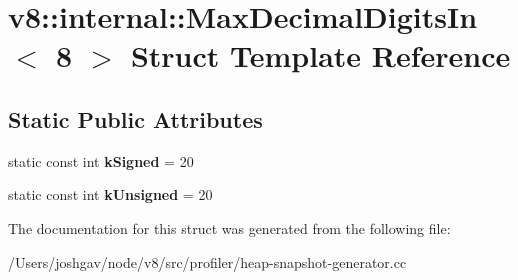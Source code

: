 \hypertarget{structv8_1_1internal_1_1_max_decimal_digits_in_3_018_01_4}{}\section{v8\+:\+:internal\+:\+:Max\+Decimal\+Digits\+In$<$ 8 $>$ Struct Template Reference}
\label{structv8_1_1internal_1_1_max_decimal_digits_in_3_018_01_4}
\subsection*{Static Public Attributes}
\begin{DoxyCompactItemize}
\item 
static const int {\bfseries k\+Signed} = 20\hypertarget{structv8_1_1internal_1_1_max_decimal_digits_in_3_018_01_4_a5d49496214ab42e45bffd9981e9aab1b}{}\label{structv8_1_1internal_1_1_max_decimal_digits_in_3_018_01_4_a5d49496214ab42e45bffd9981e9aab1b}

\item 
static const int {\bfseries k\+Unsigned} = 20\hypertarget{structv8_1_1internal_1_1_max_decimal_digits_in_3_018_01_4_a638181a897d317a42625ed1dfcba1090}{}\label{structv8_1_1internal_1_1_max_decimal_digits_in_3_018_01_4_a638181a897d317a42625ed1dfcba1090}

\end{DoxyCompactItemize}


The documentation for this struct was generated from the following file\+:\begin{DoxyCompactItemize}
\item 
/\+Users/joshgav/node/v8/src/profiler/heap-\/snapshot-\/generator.\+cc\end{DoxyCompactItemize}
